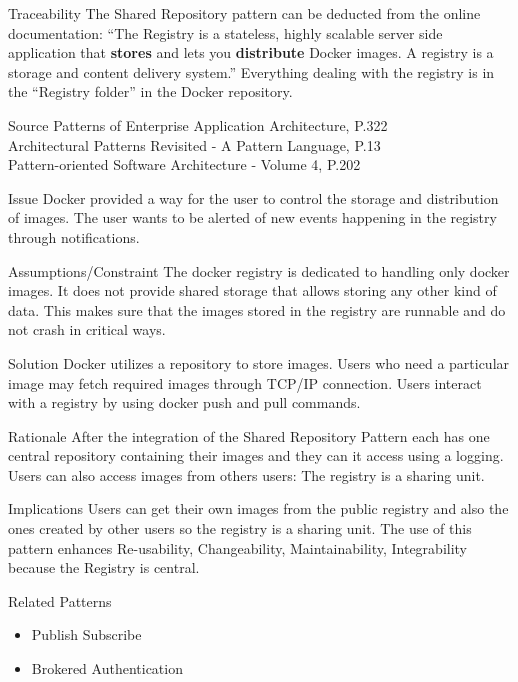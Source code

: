 \begin{patdescription}
\item[Traceability]
The Shared Repository pattern can be deducted from the online documentation:
\cite{dockregistry} ``The Registry is a stateless, highly scalable server side
application that \textbf{stores} and lets you \textbf{distribute} Docker images.
A registry is a storage and content delivery system.'' Everything dealing with
the registry is in the ``Registry folder'' in the Docker repository.


\item[Source]
Patterns of Enterprise Application Architecture, P.322 \cite{eaa}\\
Architectural Patterns Revisited - A Pattern Language, P.13 \cite{avgeriou2005architectural}\\
Pattern-oriented Software Architecture - Volume 4, P.202 \cite{wiley4}

\item[Issue]
Docker provided a way for the user to control the storage and distribution of
images. The user wants to be alerted of new events happening in the registry
through notifications. %

\item[Assumptions/Constraint]
The docker registry is dedicated to handling only docker images. It does not
provide shared storage that allows storing any other kind of data. This makes
sure that the images stored in the registry are runnable and do not crash in
critical ways.

\item[Solution] %
Docker utilizes a repository to store images. Users who need a particular image
may fetch required images through TCP/IP connection. Users interact with a
registry by using docker push and pull commands. %

\item[Rationale] %
After the integration of the Shared Repository Pattern each has one central
repository containing their images and they can it access using a logging. Users
can also access images from others users: The registry is a sharing unit.

\item [Implications]
Users can get their own images from the public registry and also the ones created by other users so the registry is a sharing unit. %
The use of this pattern enhances Re-usability, Changeability, Maintainability, Integrability because the Registry is central.

\item [Related Patterns]
\begin{itemize}
	\item Publish Subscribe 
	\item Brokered Authentication
\end{itemize}

 
\end{patdescription}

